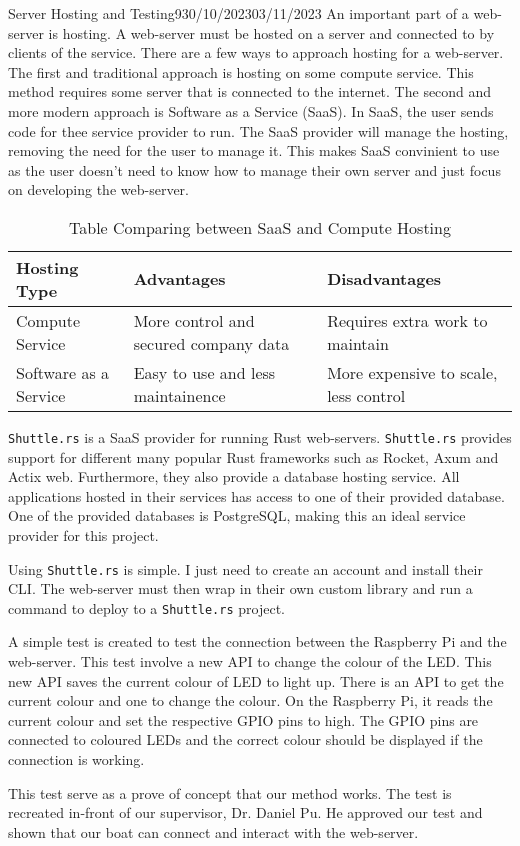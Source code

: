 \documentclass[12pt]{article}
\begin{document}
\begin{logbook-entry}{Server Hosting and Testing}{9}{30/10/2023}{03/11/2023}
An important part of a web-server is hosting.
A web-server must be hosted on a server and connected to by clients of the service.
There are a few ways to approach hosting for a web-server.
The first and traditional approach is hosting on some compute service.
This method requires some server that is connected to the internet.
The second and more modern approach is Software as a Service (SaaS).
In SaaS, the user sends code for thee service provider to run.
The SaaS provider will manage the hosting, removing the need for the user to manage it.
This makes SaaS convinient to use as the user doesn't need to know how to manage their own server and just focus on developing the web-server.

\begin{table}[H]
    \caption{Table Comparing between SaaS and Compute Hosting}
    \begin{tabularx}{\textwidth}{l X X}
        \hline
        Hosting Type & Advantages & Disadvantages\\
        \hline
        Compute Service & More control and secured company data & Requires extra work to maintain\\
        Software as a Service & Easy to use and less maintainence & More expensive to scale, less control\\
        \hline
    \end{tabularx}
\end{table}

\lstinline{Shuttle.rs} is a SaaS provider for running Rust web-servers.
\lstinline{Shuttle.rs} provides support for different many popular Rust frameworks such as Rocket, Axum and Actix web.
Furthermore, they also provide a database hosting service.
All applications hosted in their services has access to one of their provided database.
One of the provided databases is PostgreSQL, making this an ideal service provider for this project.

Using \lstinline{Shuttle.rs} is simple.
I just need to create an account and install their CLI.
The web-server must then wrap in their own custom library and run a command to deploy to a \lstinline{Shuttle.rs} project.

A simple test is created to test the connection between the Raspberry Pi and the web-server.
This test involve a new API to change the colour of the LED.
This new API saves the current colour of LED to light up.
There is an API to get the current colour and one to change the colour.
On the Raspberry Pi, it reads the current colour and set the respective GPIO pins to high.
The GPIO pins are connected to coloured LEDs and the correct colour should be displayed if the connection is working.

This test serve as a prove of concept that our method works.
The test is recreated in-front of our supervisor, Dr. Daniel Pu.
He approved our test and shown that our boat can connect and interact with the web-server.
\end{logbook-entry}
\end{document}

